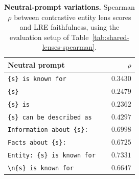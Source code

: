 \begin{table}[t]
\centering
\caption{\textbf{Neutral-prompt variations.} Spearman $\rho$ between contrastive entity lens scores and LRE faithfulness, using the evaluation setup of Table~\ref{tab:shared-lenses-spearman}.}
\label{tab:shared-prompt-variations}
\begin{tabular}{@{}lr@{}}
\toprule
Neutral prompt & $\rho$ \\
\midrule
\texttt{\{s\} is known for} & $\phantom{-}0.3430$ \\
\texttt{\{s\}} & $\phantom{-}0.2479$ \\
\texttt{\{s\} is} & $\phantom{-}0.2362$ \\
\texttt{\{s\} can be described as} & $\phantom{-}0.4297$ \\
\texttt{Information about \{s\}:} & $\phantom{-}0.6998$ \\
\texttt{Facts about \{s\}:} & $\phantom{-}0.6725$ \\
\texttt{Entity: \{s\} is known for} & $\phantom{-}0.7331$ \\
\texttt{\textbackslash n\{s\} is known for} & $\phantom{-}0.6647$ \\
\bottomrule
\end{tabular}
\end{table}

